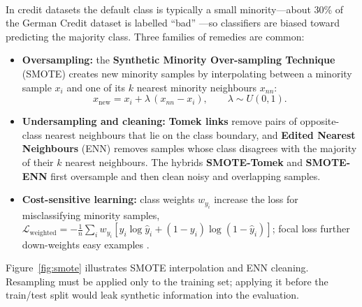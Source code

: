 \documentclass[12pt,a4paper,final]{extreport}
\begin{document}
\paragraph{} In credit datasets the default class is typically a small minority---about 30\% of the German Credit dataset is labelled ``bad'' \cite{p3}---so classifiers are biased toward predicting the majority class. Three families of remedies are common:
\begin{itemize}
  \item \textbf{Oversampling:} the \textbf{Synthetic Minority Over-sampling Technique} (SMOTE) \cite{chawla2002} creates new minority samples by interpolating between a minority sample $x_i$ and one of its $k$ nearest minority neighbours $x_{nn}$:
  \begin{equation}
  x_{\mathrm{new}}=x_i+\lambda\,(x_{nn}-x_i),\qquad \lambda\sim U(0,1).
  \label{eq:smote}
  \end{equation}
  \item \textbf{Undersampling and cleaning:} \textbf{Tomek links} remove pairs of opposite-class nearest neighbours that lie on the class boundary, and \textbf{Edited Nearest Neighbours} (ENN) removes samples whose class disagrees with the majority of their $k$ nearest neighbours. The hybrids \textbf{SMOTE-Tomek} and \textbf{SMOTE-ENN} first oversample and then clean noisy and overlapping samples.
  \item \textbf{Cost-sensitive learning:} class weights $w_{y_i}$ increase the loss for misclassifying minority samples, $\mathcal{L}_{\mathrm{weighted}}=-\frac{1}{n}\sum_i w_{y_i}[y_i\log\hat{y}_i+(1-y_i)\log(1-\hat{y}_i)]$; focal loss further down-weights easy examples \cite{p1}.
\end{itemize}
Figure~\ref{fig:smote} illustrates SMOTE interpolation and ENN cleaning. Resampling must be applied only to the training set; applying it before the train/test split would leak synthetic information into the evaluation.
\end{document}
